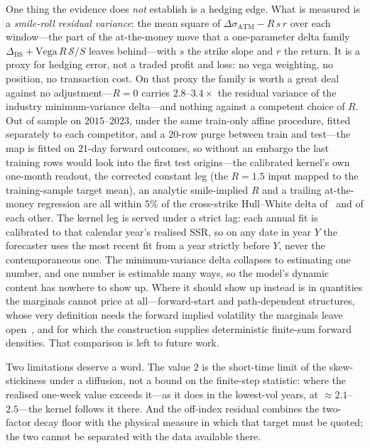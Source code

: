 \documentclass[11pt]{article}
\providecommand{\1}{\mathbf 1}
\begin{document}
One thing the evidence does \emph{not} establish is a hedging edge. What is measured is a
\emph{smile-roll residual variance}: the mean square of
$\Delta\sigma_{\mathrm{ATM}}-R\,s\,r$ over each window---the part of the at-the-money move that a
one-parameter delta family $\Delta_{\mathrm{BS}}+\mathrm{Vega}\,R\,\mathcal S/S$ leaves
behind---with $s$ the strike slope and $r$ the return. It is a proxy for hedging error, not a traded
profit and loss: no vega weighting, no position, no transaction cost. On that proxy the family is
worth a great deal against no adjustment---$R{=}0$ carries $2.8$--$3.4\times$ the residual variance
of the industry minimum-variance delta---and nothing against a competent choice of $R$. Out of
sample on $2015$--$2023$, under the same train-only affine procedure, fitted separately to each
competitor, and a $20$-row purge between train and test---the map is fitted on $21$-day forward
outcomes, so without an embargo the last training rows would look into the first test
origins---the calibrated kernel's own one-month readout, the corrected constant leg (the $R{=}1.5$
input mapped to the training-sample target mean), an analytic smile-implied $R$ and a trailing
at-the-money regression are all within
$5\%$ of the cross-strike Hull--White delta of~\cite{hullwhite2017} and of each other. The kernel leg
is served under a strict lag: each annual fit is calibrated to that calendar year's realised SSR, so
on any date in year $Y$ the forecaster uses the most recent fit from a year strictly before $Y$,
never the contemporaneous one. The
minimum-variance delta collapses to estimating one number, and one number is estimable many ways,
so the model's dynamic content has nowhere to show up. Where it should show up instead is in
quantities the marginals cannot price at all---forward-start and path-dependent structures, whose
very definition needs the forward implied volatility the marginals leave
open~\cite{glasserman2010forward}, and for which the construction supplies deterministic
finite-sum forward densities. That comparison is left to future work.

Two limitations deserve a word. The value $2$ is the short-time limit of the skew-stickiness under a
diffusion, not a bound on the finite-step statistic: where the realised one-week value exceeds
it---as it does in the lowest-vol years, at ${\approx}2.1$--$2.5$---the kernel follows it there. And
the off-index residual combines the two-factor decay floor with the physical measure in which that
target must be quoted; the two cannot be separated with the data available there.
\end{document}
